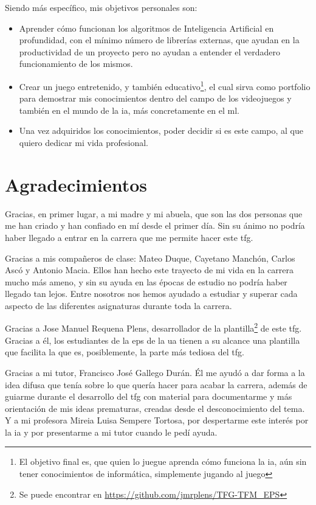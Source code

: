 Siendo más específico, mis objetivos personales son:
\begin{itemize}
    \item Aprender cómo funcionan los algoritmos de Inteligencia Artificial en profundidad, con el mínimo número de librerías externas, que ayudan en la productividad de un proyecto pero no ayudan a entender el verdadero funcionamiento de los mismos.
    \item Crear un juego entretenido, y también educativo\footnote{El objetivo final es, que quien lo juegue aprenda cómo funciona la \gls{ia}, aún sin tener conocimientos de informática, simplemente jugando al juego}, el cual sirva como portfolio para demostrar mis conocimientos dentro del campo de los videojuegos y también en el mundo de la \gls{ia}, más concretamente en el \gls{ml}.
    \item Una vez adquiridos los conocimientos, poder decidir si es este campo, al que quiero dedicar mi vida profesional.
\end{itemize}


\cleardoublepage %
\chapter*{Agradecimientos}

\thispagestyle{empty}
\vspace{1cm}

Gracias, en primer lugar, a mi madre y mi abuela, que son las dos personas que me han criado y han confiado en mí desde el primer día. Sin su ánimo no podría haber llegado a entrar en la carrera que me permite hacer este \gls{tfg}.

Gracias a mis compañeros de clase: Mateo Duque, Cayetano Manchón, Carlos Ascó y Antonio Macia. Ellos han hecho este trayecto de mi vida en la carrera mucho más ameno, y sin su ayuda en las épocas de estudio no podría haber llegado tan lejos. Entre nosotros nos hemos ayudado a estudiar y superar cada aspecto de las diferentes asignaturas durante toda la carrera. 

Gracias a Jose Manuel Requena Plens, desarrollador de la plantilla\footnote{Se puede encontrar en \url{https://github.com/jmrplens/TFG-TFM\_EPS}} de este \gls{tfg}. Gracias a él, los estudiantes de la \gls{eps} de la \gls{ua} tienen a su alcance una plantilla que facilita la que es, posiblemente, la parte más tediosa del \gls{tfg}.

Gracias a mi tutor, Francisco José Gallego Durán. Él me ayudó a dar forma a la idea difusa que tenía sobre lo que quería hacer para acabar la carrera, además de guiarme durante el desarrollo del \gls{tfg} con material para documentarme y más orientación de mis ideas prematuras, creadas desde el desconocimiento del tema. Y a mi profesora Mireia Luisa Sempere Tortosa, por despertarme este interés por la \gls{ia} y por presentarme a mi tutor cuando le pedí ayuda.

